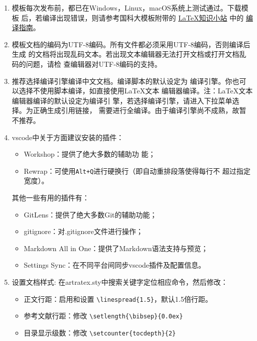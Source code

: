 \begin{enumerate}
    \item 模板每次发布前，都已在Windows，Linux，macOS系统上测试通过。下载模板
    后，若编译出现错误，则请参考国科大模板附带的
    \href{https://github.com/mohuangrui/ucasthesis/wiki}{\LaTeX{}知识小站} 中的
    \href{https://github.com/mohuangrui/ucasthesis/wiki/%E7%BC%96%E8%AF%91%E6%8C%87%E5%8D%97}{编
    译指南}。
    \item 模板文档的编码为UTF-8编码。所有文件都必须采用UTF-8编码，否则编译后生成
    的文档将出现乱码文本。若出现文本编辑器无法打开文档或打开文档乱码的问题，请检
    查编辑器对UTF-8编码的支持。
    \item 推荐选择编译引擎编译中文文档。编译脚本的默认设定为
    编译引擎。你也可以选择不使用脚本编译，如直接使用\LaTeX{}文本
    编辑器编译。注：\LaTeX{}文本编辑器编译的默认设定为编译引
    擎，若选择编译引擎，请进入下拉菜单选择。为正确生成引用链接，
    需要进行全编译。由于编译引擎尚不成熟，故暂不推荐。
    \item vscode中关于方面建议安装的插件：
        \begin{itemize}
            \item {} Workshop：提供了绝大多数的辅助功
            能；
            \item Rewrap：可使用\verb|Alt+Q|进行硬换行（即自动重排段落使得每行不
            超过指定宽度）。
        \end{itemize}
        其他一些有用的插件有：
        \begin{itemize}
            \item GitLens：提供了绝大多数Git的辅助功能；
            \item gitignore：对.gitignore文件进行操作；
            \item Markdown All in One：提供了Markdown语法支持与预览；
            \item Settings Sync：在不同平台间同步vscode插件及配置信息。
        \end{itemize}
    \item 设置文档样式: 在artratex.sty中搜索关键字定位相应命令，然后修改：
        \begin{itemize}
            \item 正文行距：启用和设置 \verb|\linespread{1.5}|，默认1.5倍行距。
            \item 参考文献行距：修改 \verb|\setlength{\bibsep}{0.0ex}|
            \item 目录显示级数：修改 \verb|\setcounter{tocdepth}{2}|

\end{itemize}
\end{enumerate}
